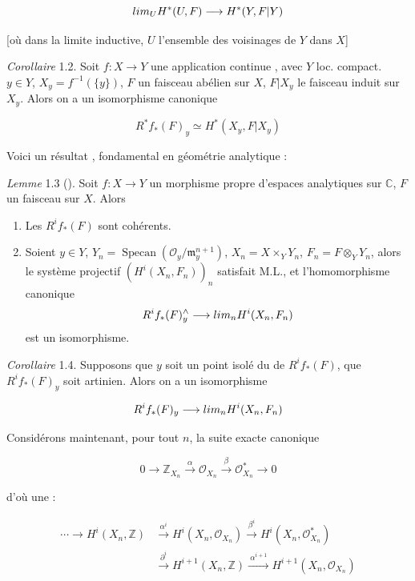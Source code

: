 \documentclass[11pt,a4paper]{article}
\begin{document}
\[
\varinjlim_{U} H^*(U, F) \longrightarrow H^*(Y, F|Y)
\]

[où dans la limite inductive, $U$  l'ensemble des voisinages de $Y$ dans $X$]

\emph{Corollaire} 1.2. Soit $f : X \to Y$ une application continue  \struck{\ill{}}, avec $Y$ loc. compact.  $y \in Y$, $X_y = f^{-1}(\{y\})$, $F$ un faisceau abélien sur $X$, $F|X_y$ le faisceau induit sur $X_y$. Alors on a un isomorphisme canonique

\[
R^*f_*(F)_y \simeq H^*(X_y, F|X_y)
\]

Voici un résultat \struck{\ill{}} , fondamental \struck{\ill{} \ill{} \ill{}} en géométrie analytique :

\emph{Lemme} 1.3 (). Soit $f : X \to Y$ un morphisme propre d'espaces analytiques sur $\mathbb{C}$, $F$ un faisceau  sur $X$. Alors
\begin{enumerate}
  \item[(i)] Les $R^if_*(F)$ sont cohérents.
  \item[(ii)] Soient $y \in Y$, $Y_n = \operatorname{Specan}(\mathcal{O}_y/\mathfrak{m}_y^{n+1})$, \struck{\ill{}} $X_n = X \times_Y Y_n$, $F_n = F \otimes_Y Y_n$, alors le système projectif $(H^i(X_n, F_n))_n$ satisfait M.L., et l'homomorphisme canonique
\[
R^if_*(F)_y^{\wedge} \longrightarrow \varprojlim_n H^i(X_n, F_n)
\]
est un isomorphisme.
\end{enumerate}

\emph{Corollaire} 1.4. Supposons que $y$ soit un point isolé du  de $R^if_*(F)$,  que $R^if_*(F)_y$ soit artinien. Alors on a un isomorphisme

\[
R^if_*(F)_y \longrightarrow \varprojlim_n H^i(X_n, F_n)
\]

Considérons maintenant, pour tout $n$, la suite exacte canonique

\[
0 \longrightarrow \mathbb{Z}_{X_n} \xrightarrow{\ \alpha\ } \mathcal{O}_{X_n} \xrightarrow{\ \beta\ } \mathcal{O}^*_{X_n} \longrightarrow 0
\]

d'où une \emph{} \ill{} :

\[
\begin{aligned}
\cdots \longrightarrow H^i(X_n, \mathbb{Z}) &\xrightarrow{\ \alpha^i\ } H^i(X_n, \mathcal{O}_{X_n}) \xrightarrow{\ \beta^i\ } H^i(X_n, \mathcal{O}^*_{X_n}) \\
&\xrightarrow{\ \partial^i\ } H^{i+1}(X_n, \mathbb{Z}) \xrightarrow{\ \alpha^{i+1}\ } H^{i+1}(X_n, \mathcal{O}_{X_n})
\end{aligned}
\]
\end{document}
